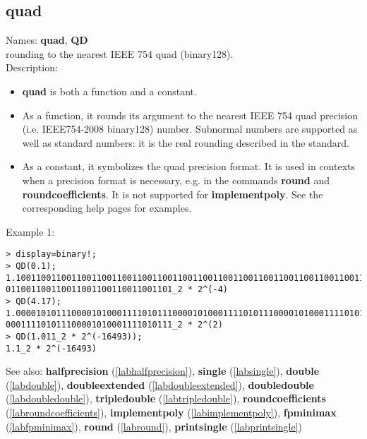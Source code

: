 \subsection{quad}
\label{labquad}
\noindent Names: \textbf{quad}, \textbf{QD}\\
rounding to the nearest IEEE 754 quad (binary128).\\
\noindent Description: \begin{itemize}

\item \textbf{quad} is both a function and a constant.

\item As a function, it rounds its argument to the nearest IEEE 754 quad precision (i.e. IEEE754-2008 binary128) number.
   Subnormal numbers are supported as well as standard numbers: it is the real
   rounding described in the standard.

\item As a constant, it symbolizes the quad precision format. It is used in 
   contexts when a precision format is necessary, e.g. in the commands 
   \textbf{round} and \textbf{roundcoefficients}. It is not supported for \textbf{implementpoly}.
   See the corresponding help pages for examples.
\end{itemize}
\noindent Example 1: 
\begin{center}\begin{minipage}{15cm}\begin{Verbatim}[frame=single]
> display=binary!;
> QD(0.1);
1.100110011001100110011001100110011001100110011001100110011001100110011001100110
011001100110011001100110011001101_2 * 2^(-4)
> QD(4.17);
1.000010101110000101000111101011100001010001111010111000010100011110101110000101
000111101011100001010001111010111_2 * 2^(2)
> QD(1.011_2 * 2^(-16493));
1.1_2 * 2^(-16493)
\end{Verbatim}
\end{minipage}\end{center}
See also: \textbf{halfprecision} (\ref{labhalfprecision}), \textbf{single} (\ref{labsingle}), \textbf{double} (\ref{labdouble}), \textbf{doubleextended} (\ref{labdoubleextended}), \textbf{doubledouble} (\ref{labdoubledouble}), \textbf{tripledouble} (\ref{labtripledouble}), \textbf{roundcoefficients} (\ref{labroundcoefficients}), \textbf{implementpoly} (\ref{labimplementpoly}), \textbf{fpminimax} (\ref{labfpminimax}), \textbf{round} (\ref{labround}), \textbf{printsingle} (\ref{labprintsingle})
